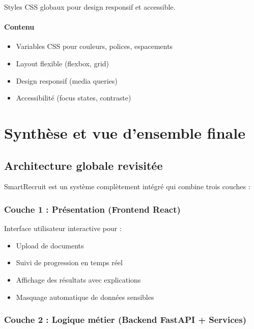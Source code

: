 \documentclass[12pt,a4paper,oneside]{book}
\begin{document}
Styles CSS globaux pour design responsif et accessible.

\subsubsection{Contenu}

\begin{itemize}
    \item Variables CSS pour couleurs, polices, espacements
    \item Layout flexible (flexbox, grid)
    \item Design responsif (media queries)
    \item Accessibilité (focus states, contraste)
\end{itemize}

\newpage


\chapter{Synthèse et vue d'ensemble finale}

\section{Architecture globale revisitée}

SmartRecruit est un système complètement intégré qui combine trois couches :

\subsection{Couche 1 : Présentation (Frontend React)}

Interface utilisateur interactive pour :
\begin{itemize}
    \item Upload de documents
    \item Suivi de progression en temps réel
    \item Affichage des résultats avec explications
    \item Masquage automatique de données sensibles
\end{itemize}

\subsection{Couche 2 : Logique métier (Backend FastAPI + Services)}
\end{document}
